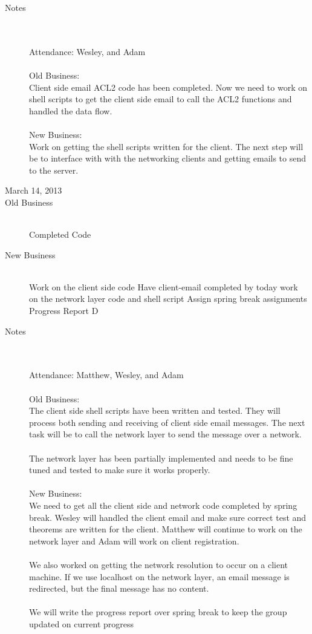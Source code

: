\documentclass[11pt, letterpaper]{report}
\begin{document}
\begin{description}
\item[Notes] \hfill \\ \hfill \\
Attendance: Wesley, and Adam\\ \\
Old Business: \\
Client side email ACL2 code has been completed. Now we need to work on shell scripts to get the client side email to call the ACL2 functions and handled the data flow.
\\ \\
New Business:\\
Work on getting the shell scripts written for the client. The next step will be to interface with with the networking clients and getting emails to send to the server.



\newpage
\item[\Large March 14, 2013]
\hypertarget{March 14, 2013} {}
\item[Old Business] \hfill \\
\subitem Completed Code
\item[New Business] \hfill \\
\subitem Work on the client side code
\subsubitem Have client-email completed by today
\subitem work on the network layer code and shell script
\subitem Assign spring break assignments
\subitem Progress Report D

\item[Notes] \hfill \\ \hfill \\
Attendance:  Matthew, Wesley, and Adam\\ \\
Old Business: \\
The client side shell scripts have been written and tested. They will process both sending and receiving of client side email messages. The next task will be to call the network layer to send the message over a network. \\ \\
The network layer has been partially implemented and needs to be fine tuned and tested to make sure it works properly. 
\\ \\
New Business:\\
We need to get all the client side and network code completed by spring break. Wesley will handled the client email and make sure correct test and theorems are written for the client. Matthew will continue to work on the network layer and Adam will work on client registration. \\ \\
We also worked on getting the network resolution to occur on a client machine. If we use localhost on the network layer, an email message is redirected, but the final message has no content. \\ \\
We will write the progress report over spring break to keep the group updated on current progress




\end{description}
\end{document}

